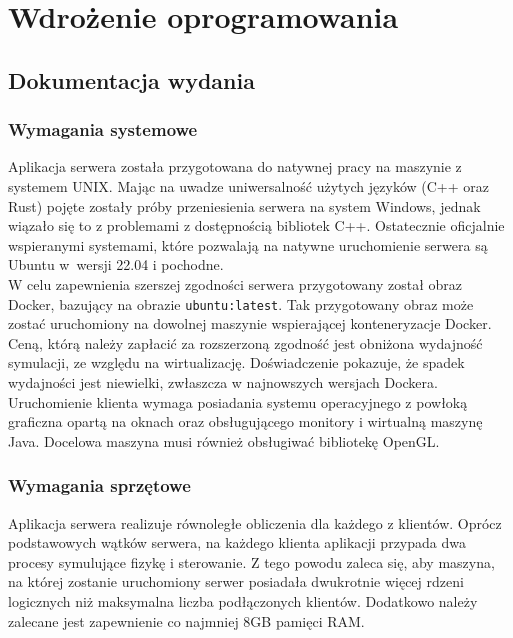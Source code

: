 \chapter{Wdrożenie oprogramowania}
\section{Dokumentacja wydania}
\subsection{Wymagania systemowe}
Aplikacja serwera została przygotowana do natywnej pracy na maszynie z systemem UNIX. Mając na uwadze uniwersalność użytych języków (C++ oraz Rust) pojęte zostały próby przeniesienia serwera na system Windows, jednak wiązało się to z problemami z dostępnością bibliotek C++. Ostatecznie oficjalnie wspieranymi systemami, które pozwalają na natywne uruchomienie serwera są Ubuntu w~wersji 22.04 i pochodne. \\

W celu zapewnienia szerszej zgodności serwera przygotowany został obraz Docker, bazujący na obrazie \texttt{ubuntu:latest}. Tak przygotowany obraz może zostać uruchomiony na dowolnej maszynie wspierającej konteneryzacje Docker. Ceną, którą należy zapłacić za rozszerzoną zgodność jest obniżona wydajność symulacji, ze względu na wirtualizację. Doświadczenie pokazuje, że spadek wydajności jest niewielki, zwłaszcza w najnowszych wersjach Dockera.\\

 Uruchomienie klienta wymaga posiadania systemu operacyjnego z powłoką graficzna opartą na oknach oraz obsługującego monitory i wirtualną maszynę Java. Docelowa maszyna musi również obsługiwać bibliotekę OpenGL.


\subsection{Wymagania sprzętowe}

Aplikacja serwera realizuje równoległe obliczenia dla każdego z klientów. Oprócz podstawowych wątków serwera, na każdego klienta aplikacji przypada dwa procesy symulujące fizykę i sterowanie. Z tego powodu zaleca się, aby maszyna, na której zostanie uruchomiony serwer posiadała dwukrotnie więcej rdzeni logicznych niż maksymalna liczba podłączonych klientów. Dodatkowo należy zalecane jest zapewnienie co najmniej 8GB pamięci RAM. \\

